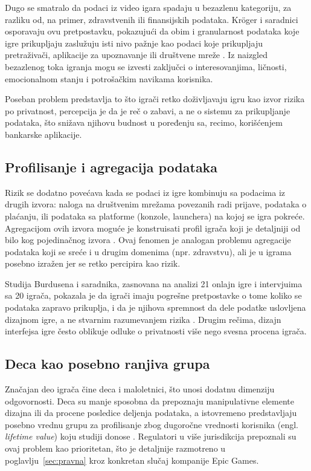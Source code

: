 \documentclass[12pt]{article}
\begin{document}
Dugo se smatralo da podaci iz video igara spadaju u bezazlenu kategoriju, za razliku od, na primer, zdravstvenih ili finansijskih podataka. Kröger i saradnici osporavaju ovu pretpostavku, pokazujući da obim i granularnost podataka koje igre prikupljaju zaslužuju isti nivo pažnje kao podaci koje prikupljaju pretraživači, aplikacije za upoznavanje ili društvene mreže \cite{kroger2023}. Iz naizgled bezazlenog toka igranja mogu se izvesti zaključci o interesovanjima, ličnosti, emocionalnom stanju i potrošačkim navikama korisnika.

Poseban problem predstavlja to što igrači retko doživljavaju igru kao izvor rizika po privatnost, percepcija je da je reč o zabavi, a ne o sistemu za prikupljanje podataka, što snižava njihovu budnost u poređenju sa, recimo, korišćenjem bankarske aplikacije.
\subsection{Profilisanje i agregacija podataka}

Rizik se dodatno povećava kada se podaci iz igre kombinuju sa podacima iz drugih izvora: naloga na društvenim mrežama povezanih radi prijave, podataka o plaćanju, ili podataka sa platforme (konzole, launchera) na kojoj se igra pokreće. Agregacijom ovih izvora moguće je konstruisati profil igrača koji je detaljniji od bilo kog pojedinačnog izvora \cite{kroger2023}. Ovaj fenomen je analogan problemu agregacije podataka koji se sreće i u drugim domenima (npr. zdravstvu), ali je u igrama posebno izražen jer se retko percipira kao rizik.

Studija Burdusena i saradnika, zasnovana na analizi 21 onlajn igre i intervjuima sa 20 igrača, pokazala je da igrači imaju pogrešne pretpostavke o tome koliko se podataka zapravo prikuplja, i da je njihova spremnost da dele podatke uslovljena dizajnom igre, a ne stvarnim razumevanjem rizika \cite{bourdoucen2023}. Drugim rečima, dizajn interfejsa igre često oblikuje odluke o privatnosti više nego svesna procena igrača.
\subsection{Deca kao posebno ranjiva grupa}

Značajan deo igrača čine deca i maloletnici, što unosi dodatnu dimenziju odgovornosti. Deca su manje sposobna da prepoznaju manipulativne elemente dizajna ili da procene posledice deljenja podataka, a istovremeno predstavljaju posebno vrednu grupu za profilisanje zbog dugoročne vrednosti korisnika (engl. \textit{lifetime value}) koju studiji donose \cite{kroger2023}. Regulatori u više jurisdikcija prepoznali su ovaj problem kao prioritetan, što je detaljnije razmotreno u poglavlju~\ref{sec:pravna} kroz konkretan slučaj kompanije Epic Games.
\end{document}
